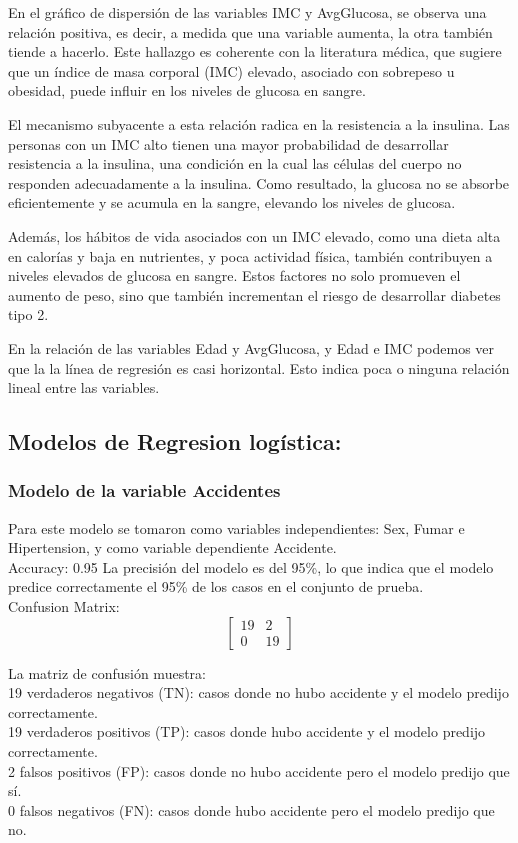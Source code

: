 \documentclass[a4paper, 12pt]{article}
\begin{document}
En el gráfico de dispersión de las variables IMC y AvgGlucosa, se observa una relación positiva, es decir, a medida que una variable aumenta, la otra también tiende a hacerlo. Este hallazgo es coherente con la literatura médica, que sugiere que un índice de masa corporal (IMC) elevado, asociado con sobrepeso u obesidad, puede influir en los niveles de glucosa en sangre.

El mecanismo subyacente a esta relación radica en la resistencia a la insulina. Las personas con un IMC alto tienen una mayor probabilidad de desarrollar resistencia a la insulina, una condición en la cual las células del cuerpo no responden adecuadamente a la insulina. Como resultado, la glucosa no se absorbe eficientemente y se acumula en la sangre, elevando los niveles de glucosa.

Además, los hábitos de vida asociados con un IMC elevado, como una dieta alta en calorías y baja en nutrientes, y poca actividad física, también contribuyen a niveles elevados de glucosa en sangre. Estos factores no solo promueven el aumento de peso, sino que también incrementan el riesgo de desarrollar diabetes tipo 2.

En la relación de las variables Edad y AvgGlucosa, y Edad e IMC podemos ver que la la línea de regresión es casi horizontal. Esto indica poca o ninguna relación lineal entre las variables.

\newpage

\subsection{Modelos de Regresion logística:}

\subsubsection{Modelo de la variable Accidentes}

Para este modelo se tomaron como variables independientes: Sex, Fumar e Hipertension, y como
variable dependiente Accidente.
\\
Accuracy: 0.95
La precisión del modelo es del 95\%, lo que indica que el modelo 
predice correctamente el 95\% de los casos en el conjunto de prueba.
\\
Confusion Matrix:
\[
\begin{bmatrix}
19 & 2 \\
0 & 19
\end{bmatrix}\]

La matriz de confusión muestra:
\\
19 verdaderos negativos (TN): casos donde no hubo accidente y el modelo predijo correctamente.
\\
19 verdaderos positivos (TP): casos donde hubo accidente y el modelo predijo correctamente.
\\
2 falsos positivos (FP): casos donde no hubo accidente pero el modelo predijo que sí.
\\
0 falsos negativos (FN): casos donde hubo accidente pero el modelo predijo que no.
\end{document}
